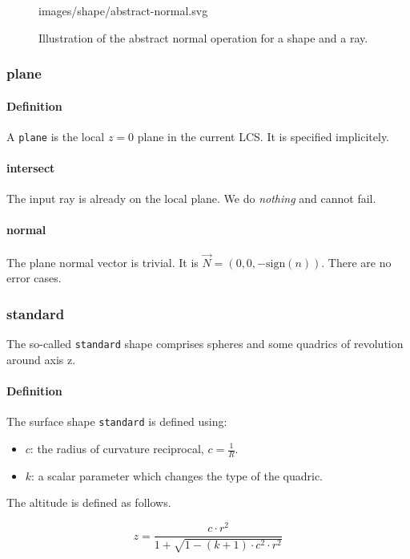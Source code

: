 \begin{figure} \caption{\label{fig:abstract-normal} Illustration of the
abstract normal operation for a shape and a ray.}

           {images/shape/abstract-normal.svg}
\end{figure}

\subsubsection{plane}
\paragraph{Definition}
A \lstinline{plane} is the local $z=0$ plane in the current \gls{LCS}.
It is specified implicitely.

\paragraph{intersect}
The input ray is already on the local plane. We do \emph{nothing} and cannot
fail.

\paragraph{normal}
The plane normal vector is trivial.
It is $\overrightarrow{N} = (0, 0, -\textrm{sign}(n))$.
There are no error cases.

\subsubsection{standard}
The so-called \lstinline{standard} shape comprises spheres and some quadrics of
revolution around axis z.

\paragraph{Definition}
The surface shape \lstinline{standard} is defined using:
\begin{itemize}
\item $c$: the radius of curvature reciprocal, $c = \frac{1}{R}$.
\item $k$: a scalar parameter which changes the type of the quadric.
\end{itemize}

The altitude is defined as follows.

\begin{equation} \label{eq:standard-z}
z = \frac{c \cdot r^2}{1 + \sqrt{1 - (k + 1) \cdot c^2 \cdot r^2}}
\end{equation}

